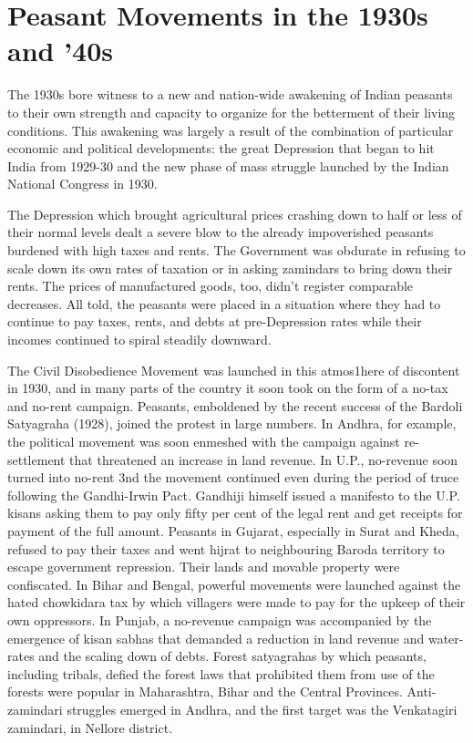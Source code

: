 \cleardoublepage
\chapter{Peasant Movements in the 1930s and '40s}



The 1930s bore witness to a new and nation-wide awakening of Indian peasants to their own strength and capacity to organize for the betterment of their living conditions. This awakening was largely a result of the combination of particular economic and political developments: the great Depression that began to hit India from 1929-30 and the new phase of mass struggle launched by the Indian National Congress in 1930.

The Depression which brought agricultural prices crashing down to half or less of their normal levels dealt a severe blow to the already impoverished peasants burdened with high taxes and rents. The Government was obdurate in refusing to scale down its own rates of taxation or in asking zamindars to bring down their rents. The prices of manufactured goods, too, didn't register comparable decreases. All told, the peasants were placed in a situation where they had to continue to pay taxes, rents, and debts at pre-Depression rates while their incomes continued to spiral steadily downward.

The Civil Disobedience Movement was launched in this atmos1here of discontent in 1930, and in many parts of the country it soon took on the form of a no-tax and no-rent campaign. Peasants, emboldened by the recent success of the Bardoli Satyagraha (1928), joined the protest in large numbers. In Andhra, for example, the political movement was soon enmeshed with the campaign against re-settlement that threatened an increase in land revenue. In U.P., no-revenue soon turned into no-rent 3nd the movement continued even during the period of truce following the Gandhi-Irwin Pact. Gandhiji himself issued a manifesto to the U.P. kisans asking them to pay only fifty per cent of the legal rent and get receipts for payment of the full amount. Peasants in Gujarat, especially in Surat and Kheda, refused to pay their taxes and went hijrat to neighbouring Baroda territory to escape government repression. Their lands and movable property were confiscated. In Bihar and Bengal, powerful movements were launched against the hated chowkidara tax by which villagers were made to pay for the upkeep of their own oppressors. In Punjab, a no-revenue campaign was accompanied by the emergence of kisan sabhas that demanded a reduction in land revenue and water-rates and the scaling down of debts. Forest satyagrahas by which peasants, including tribals, defied the forest laws that prohibited them from use of the forests were popular in Maharashtra, Bihar and the Central Provinces. Anti-zamindari struggles emerged in Andhra, and the first target was the Venkatagiri zamindari, in Nellore district.

